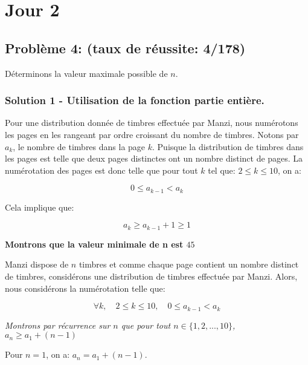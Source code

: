 \documentclass[12pt,a4paper,article]{memoir}
\begin{document}
\section{Jour 2}
\subsection{Problème 4: (taux de réussite: 4/178)}

Déterminons la valeur maximale possible de $n$.
\subsubsection{Solution 1 - Utilisation de la fonction partie entière.}

\begin{myremark}[colback=red!5!white,colframe=blue!75!black,mytitle={Numérotation des pages suivant le nombre de timbres.}, label=rmsec]
Pour une distribution donnée de timbres effectuée par Manzi, nous numérotons les pages en les rangeant par ordre croissant du nombre de timbres. Notons par $a_{k}$, le nombre de timbres dans la page $k$. Puisque la distribution de timbres dans les pages est telle que deux pages distinctes ont un nombre distinct de pages. La numérotation des pages est donc telle que pour tout $k$ tel que: $2 \leq k \leq 10$, on a:

\[0 \leq a_{k-1} < a_{k}\]

Cela implique que:

\begin{equation}
a_{k} \geq a_{k-1} + 1 \geq 1
\label{equation-relation-nb-pages}
\end{equation}

\end{myremark}

\textbf{Montrons que la valeur minimale de n est $45$}

\bigskip

Manzi dispose de $n$ timbres et comme chaque page contient un nombre distinct de timbres, considérons une distribution de timbres effectuée par Manzi. Alors, nous considérons la numérotation telle que: 

\[ \forall k, \quad 2 \leq k \leq 10, \quad 0 \leq a_{k-1} < a_{k}\]

\textit{Montrons par récurrence sur $n$ que pour tout $n \in \{1, 2, ..., 10\}$, $a_{n} \geq a_{1} + (n-1)$}

\bigskip

Pour $n = 1$, on a: $a_{n} = a_{1} + (n-1)$.
\end{document}
